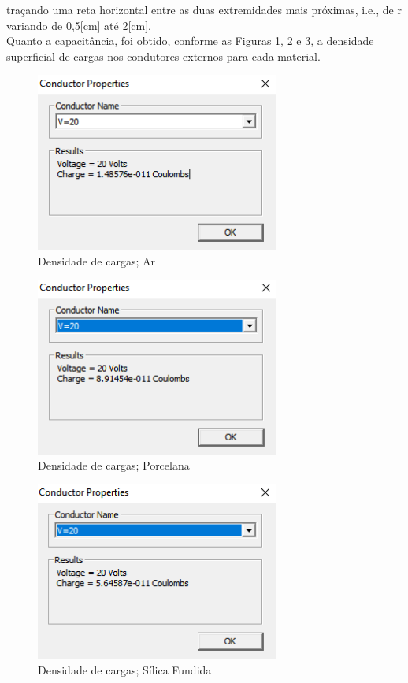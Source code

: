\documentclass[a4paper]{article}
\begin{document}
\begin{multicols}{2}
	\noindent traçando uma reta horizontal entre as duas extremidades mais próximas, i.e., de r variando de 0,5[cm] até 2[cm].\\
	
	Quanto a capacitância, foi obtido, conforme as Figuras \ref{fig:Qar}, \ref{fig:Qporcelana} e \ref{fig:Qsilica}, a densidade superficial de cargas nos condutores externos para cada material.
	
	\begin{figure} [H]
		\centering
		\caption{Densidade de cargas; Ar\label{fig:Qar}}
		\includegraphics[width=8cm ,fbox]{latex/Qar.png}
	\end{figure}
	
	\begin{figure} [H]
		\centering
		\caption{Densidade de cargas; Porcelana\label{fig:Qporcelana}}
		\includegraphics[width=8cm ,fbox]{latex/Qporcelana.png}
	\end{figure}
	
	\begin{figure} [H]
		\centering
		\caption{Densidade de cargas; Sílica Fundida\label{fig:Qsilica}}
		\includegraphics[width=8cm ,fbox]{latex/Qsilica.png}
	\end{figure}


\end{multicols}
\end{document}
